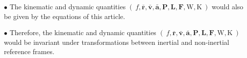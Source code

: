 \documentclass[10pt,fleqn]{article}
\begin{document}
\par \bigskip \smallskip
\noindent $\bullet$ The kinematic and dynamic quantities {\small $( \: f, \bar{\mathbf{r}}, \bar{\mathbf{v}}, \bar{\mathbf{a}}, \mathbf{P}, \mathbf{L}, \mathbf{F}, \mathrm{W}, \mathrm{K} \: )$} would also be given by the equations of this article.
\par \bigskip \smallskip
\noindent $\bullet$ Therefore, the kinematic and dynamic quantities {\small $( \: f, \bar{\mathbf{r}}, \bar{\mathbf{v}}, \bar{\mathbf{a}}, \mathbf{P}, \mathbf{L}, \mathbf{F}, \mathrm{W}, \mathrm{K} \: )$} would be invariant under transformations between inertial and non\hspace{+0.03em}-\hspace{+0.03em}inertial \hbox {reference} frames.

\newpage

\par {}

\bigskip \smallskip
\end{document}
